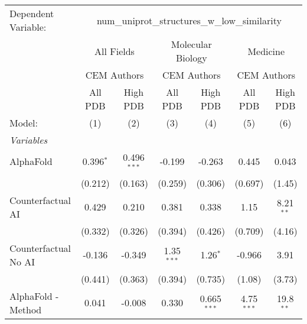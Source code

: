 \begingroup
\centering
\begin{tabular}{lcccccc}
   \tabularnewline \midrule \midrule
   Dependent Variable: & \multicolumn{6}{c}{num\_uniprot\_structures\_w\_low\_similarity}\\
 & \multicolumn{2}{c}{All Fields} & \multicolumn{2}{c}{Molecular Biology} & \multicolumn{2}{c}{Medicine} \\
\cmidrule(lr){2-3} \cmidrule(lr){4-5} \cmidrule(lr){6-7}
 & \multicolumn{2}{c}{CEM Authors} & \multicolumn{2}{c}{CEM Authors} & \multicolumn{2}{c}{CEM Authors} \\
\cmidrule(lr){2-3} \cmidrule(lr){4-5} \cmidrule(lr){6-7}
 & \multicolumn{1}{c}{All PDB} & \multicolumn{1}{c}{High PDB} & \multicolumn{1}{c}{All PDB} & \multicolumn{1}{c}{High PDB} & \multicolumn{1}{c}{All PDB} & \multicolumn{1}{c}{High PDB} \\
\cmidrule(lr){2-2} \cmidrule(lr){3-3} \cmidrule(lr){4-4} \cmidrule(lr){5-5} \cmidrule(lr){6-6} \cmidrule(lr){7-7}
   Model:                                                     & (1)           & (2)           & (3)          & (4)           & (5)           & (6)\\  
   \midrule
   \emph{Variables}\\
   AlphaFold                                                  & 0.396$^{*}$   & 0.496$^{***}$ & -0.199       & -0.263        & 0.445         & 0.043\\   
                                                              & (0.212)       & (0.163)       & (0.259)      & (0.306)       & (0.697)       & (1.45)\\   
   Counterfactual AI                                          & 0.429         & 0.210         & 0.381        & 0.338         & 1.15          & 8.21$^{**}$\\   
                                                              & (0.332)       & (0.326)       & (0.394)      & (0.426)       & (0.709)       & (4.16)\\   
   Counterfactual No AI                                       & -0.136        & -0.349        & 1.35$^{***}$ & 1.26$^{*}$    & -0.966        & 3.91\\   
                                                              & (0.441)       & (0.363)       & (0.394)      & (0.735)       & (1.08)        & (3.73)\\   
   AlphaFold - Method                                         & 0.041         & -0.008        & 0.330        & 0.665$^{***}$ & 4.75$^{***}$  & 19.8$^{**}$\\   

\end{tabular}
